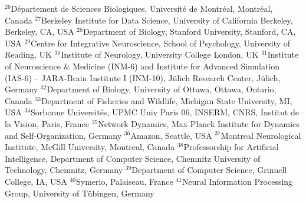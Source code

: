 $^{26}$Département de Sciences Biologiques, Université de Montréal, Montréal, Canada
$^{27}$Berkeley Institute for Data Science, University of California Berkeley, Berkeley, CA, USA
$^{28}$Department of Biology, Stanford University, Stanford, CA, USA
$^{29}$Centre for Integrative Neuroscience, School of Psychology, University of Reading, UK
$^{30}$Institute of Neurology, University College London, UK
$^{31}$Institute of Neuroscience \& Medicine (INM-6) and Institute for Advanced Simulation (IAS-6) -- JARA-Brain Institute I (INM-10), Jülich Research Center, Jülich, Germany
$^{32}$Department of Biology, University of Ottawa, Ottawa, Ontario, Canada
$^{33}$Department of Fisheries and Wildlife, Michigan State University, MI, USA
$^{34}$Sorbonne Universités, UPMC Univ Paris 06, INSERM, CNRS, Institut de la Vision, Paris, France
$^{35}$Network Dynamics, Max Planck Institute for Dynamics and Self-Organization, Germany
$^{36}$Amazon, Seattle, USA
$^{37}$Montreal Neurological Institute, McGill University, Montreal, Canada
$^{38}$Professorship for Artificial Intelligence, Department of Computer Science, Chemnitz University of Technology, Chemnitz, Germany
$^{39}$Department of Computer Science, Grinnell College, IA, USA
$^{40}$Symerio, Palaiseau, France
$^{41}$Neural Information Processing Group, University of Tübingen, Germany
\par